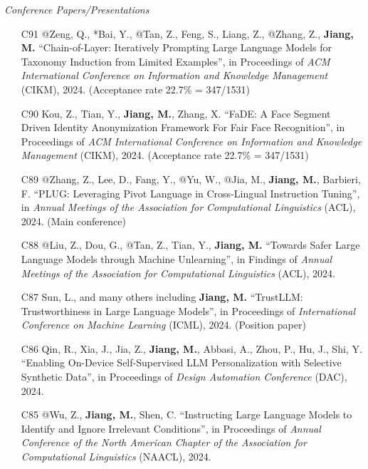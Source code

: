 \documentclass[10pt]{article}
\newenvironment{myindentpar}[1]%
{\begin{list}{}%
         {\setlength{\leftmargin}{#1}}%
         \item[]%
}
{\end{list}}
\newcounter{list}
\begin{document}
\begin{myindentpar}{0.00cm}

\hspace{-0.25cm}\textit{Conference Papers/Presentations}

\begin{enumerate}[leftmargin=.5cm]

\item[C91] @Zeng, Q., *Bai, Y., @Tan, Z., Feng, S., Liang, Z., @Zhang, Z., \textbf{Jiang, M.} ``Chain-of-Layer: Iteratively Prompting Large Language Models for Taxonomy Induction from Limited Examples'', in Proceedings of \textit{ACM International Conference on Information and Knowledge Management} (CIKM), 2024. (Acceptance rate 22.7\% = 347/1531)

\item[C90] Kou, Z., Tian, Y., \textbf{Jiang, M.}, Zhang, X. ``FaDE: A Face Segment Driven Identity Anonymization Framework For Fair Face Recognition'', in Proceedings of \textit{ACM International Conference on Information and Knowledge Management} (CIKM), 2024. (Acceptance rate 22.7\% = 347/1531)

\item[C89] @Zhang, Z., Lee, D., Fang, Y., @Yu, W., @Jia, M., \textbf{Jiang, M.}, Barbieri, F. ``PLUG: Leveraging Pivot Language in Cross-Lingual Instruction Tuning'', in \textit{Annual Meetings of the Association for Computational Linguistics} (ACL), 2024. (Main conference)

\item[C88] @Liu, Z., Dou, G., @Tan, Z., Tian, Y., \textbf{Jiang, M.} ``Towards Safer Large Language Models through Machine Unlearning'', in Findings of \textit{Annual Meetings of the Association for Computational Linguistics} (ACL), 2024.

\item[C87] Sun, L., and many others including \textbf{Jiang, M.} ``TrustLLM: Trustworthiness in Large Language Models'', in Proceedings of \textit{International Conference on Machine Learning} (ICML), 2024. (Position paper)
		
\item[C86] Qin, R., Xia, J., Jia, Z., \textbf{Jiang, M.}, Abbasi, A., Zhou, P., Hu, J., Shi, Y. ``Enabling On-Device Self-Supervised LLM Personalization with Selective Synthetic Data'', in Proceedings of \textit{Design Automation Conference} (DAC), 2024.

\item[C85] @Wu, Z., \textbf{Jiang, M.}, Shen, C. ``Instructing Large Language Models to Identify and Ignore Irrelevant Conditions'', in Proceedings of \textit{Annual Conference of the North American Chapter of the Association for Computational Linguistics} (NAACL), 2024.


\end{enumerate}
\end{myindentpar}
\end{document}
